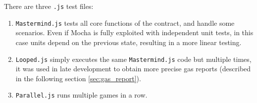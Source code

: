{There are three \texttt{.js} test files:
\begin{enumerate}
    \item \texttt{Mastermind.js} tests all core functions of the contract, and handle some scenarios. 
    Even if Mocha is fully exploited with independent unit tests, in this case units depend on the previous state, resulting in a more linear testing. 
    \item \texttt{Looped.js} simply executes the same \texttt{Mastermind.js} code but multiple times, it was used in late development to obtain more precise gas reports (described in the following section \ref{sec:gas_report}).
    \item \texttt{Parallel.js} runs multiple games in a row.
\end{enumerate}}